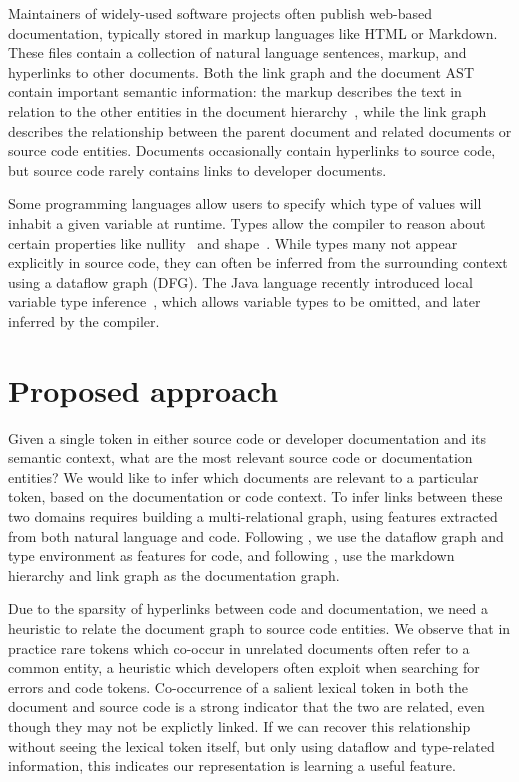 \documentclass{article}
\begin{document}
Maintainers of widely-used software projects often publish web-based documentation, typically stored in markup languages like HTML or Markdown. These files contain a collection of natural language sentences, markup, and hyperlinks to other documents. Both the link graph and the document AST contain important semantic information: the markup describes the text in relation to the other entities in the document hierarchy~\citep{yang2016hierarchical}, while the link graph describes the relationship between the parent document and related documents or source code entities. Documents occasionally contain hyperlinks to source code, but source code rarely contains links to developer documents.

Some programming languages allow users to specify which type of values will inhabit a given variable at runtime. Types allow the compiler to reason about certain properties like nullity~\citep{ekman2007pluggable} and shape~\citep{considine2019kotlingrad}. While types many not appear explicitly in source code, they can often be inferred from the surrounding context using a dataflow graph (DFG). The Java language recently introduced local variable type inference~\citet{liddell2019analyzing}, which allows variable types to be omitted, and later inferred by the compiler.

\section{Proposed approach}

Given a single token in either source code or developer documentation and its semantic context, what are the most relevant source code or documentation entities? We would like to infer which documents are relevant to a particular token, based on the documentation or code context. To infer links between these two domains requires building a multi-relational graph, using features extracted from both natural language and code. Following \citet{si2018learning, gu2018deep, 10.1145/3361242.3362774}, we use the dataflow graph and type environment as features for code, and following \citet{yang2016hierarchical, zhang2018link}, use the markdown hierarchy and link graph as the documentation graph.

Due to the sparsity of hyperlinks between code and documentation, we need a heuristic to relate the document graph to source code entities. We observe that in practice rare tokens which co-occur in unrelated documents often refer to a common entity, a heuristic which developers often exploit when searching for errors and code tokens. Co-occurrence of a salient lexical token in both the document and source code is a strong indicator that the two are related, even though they may not be explictly linked. If we can recover this relationship without seeing the lexical token itself, but only using dataflow and type-related information, this indicates our representation is learning a useful feature.
\end{document}
